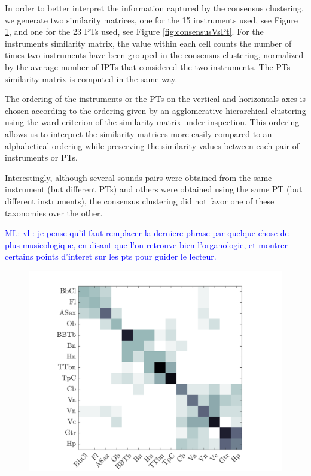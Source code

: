 \documentclass{bmcart}
\newcommand{\ml}[1]{\textcolor{blue}{ML: #1}}
\begin{document}
In order to better interpret the information captured by the consensus clustering, we generate two similarity matrices, one for the 15 instruments used, see Figure \ref{fig:consensusVsI}, and one for the 23 PTs used, see Figure \ref{fig:consensusVsPt}. For the instruments similarity matrix, the value within each cell counts the number of times two instruments have been grouped in the consensus clustering, normalized by the average number of IPTs that considered the two instruments. The PTs similarity matrix is computed in the same way.

The ordering of the instruments or the PTs on the vertical and horizontals axes is chosen according to the ordering given by an agglomerative hierarchical clustering using the ward criterion of the similarity matrix under inspection. This ordering allows us to interpret the similarity matrices more easily compared to an alphabetical ordering while preserving the  similarity values between each pair of instruments or PTs.

Interestingly, although several sounds pairs were obtained from the same instrument (but different PTs) and others were obtained using the same PT (but different instruments), the consensus clustering did not favor one of these taxonomies over the other.

\ml{vl : je pense qu'il faut remplacer la derniere phrase par quelque chose de plus musicologique, en disant que l'on retrouve bien l'organologie, et montrer certains points d'interet sur les pts pour guider le lecteur.}

\begin{figure}
\center
\includegraphics[width = \textwidth]{figures/consensusVsI.png}
\caption{}
\label{fig:consensusVsI}
\end{figure}
\end{document}
